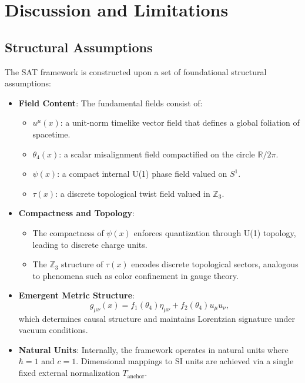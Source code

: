 \documentclass[12pt]{article}
\begin{document}
\newpage
\section{Discussion and Limitations}

\subsection{Structural Assumptions}

The SAT framework is constructed upon a set of foundational structural assumptions:

\begin{itemize}
    \item \textbf{Field Content}: The fundamental fields consist of:
    \begin{itemize}
        \item \( u^\mu(x) \): a unit-norm timelike vector field that defines a global foliation of spacetime.
        \item \( \theta_4(x) \): a scalar misalignment field compactified on the circle \( \mathbb{R}/2\pi \).
        \item \( \psi(x) \): a compact internal U(1) phase field valued on \( S^1 \).
        \item \( \tau(x) \): a discrete topological twist field valued in \( \mathbb{Z}_3 \).
    \end{itemize}
    \item \textbf{Compactness and Topology}: 
    \begin{itemize}
        \item The compactness of \( \psi(x) \) enforces quantization through U(1) topology, leading to discrete charge units.
        \item The \( \mathbb{Z}_3 \) structure of \( \tau(x) \) encodes discrete topological sectors, analogous to phenomena such as color confinement in gauge theory.
    \end{itemize}
    \item \textbf{Emergent Metric Structure}:
    \[
    g_{\mu\nu}(x) = f_1(\theta_4) \eta_{\mu\nu} + f_2(\theta_4) u_\mu u_\nu,
    \]
    which determines causal structure and maintains Lorentzian signature under vacuum conditions.
    \item \textbf{Natural Units}: Internally, the framework operates in natural units where \( \hbar = 1 \) and \( c = 1 \). Dimensional mappings to SI units are achieved via a single fixed external normalization \( T_{\text{anchor}} \).
\end{itemize}
\end{document}
